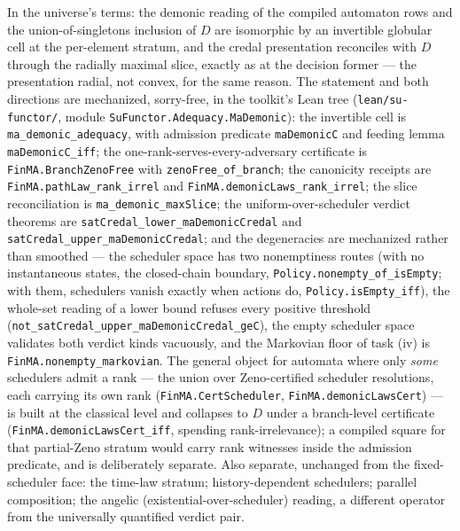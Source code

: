 In the universe's terms: the demonic reading of the compiled automaton
rows and the union-of-singletons inclusion of $D$ are isomorphic by an
invertible globular cell at the per-element stratum, and the credal
presentation reconciles with $D$ through the radially maximal slice,
exactly as at the decision former --- the presentation radial, not
convex, for the same reason.  The statement and both directions are
mechanized, sorry-free, in the toolkit's Lean tree
(\texttt{lean/su-functor/}, module
\texttt{SuFunctor.Adequacy.MaDemonic}): the invertible cell is
\texttt{ma\_demonic\_adequacy}, with admission predicate
\texttt{maDemonicC} and feeding lemma \texttt{maDemonicC\_iff}; the
one-rank-serves-every-adversary certificate is
\texttt{FinMA.BranchZenoFree} with \texttt{zenoFree\_of\_branch}; the
canonicity receipts are \texttt{FinMA.pathLaw\_rank\_irrel} and
\texttt{FinMA.demonicLaws\_rank\_irrel}; the slice reconciliation is
\texttt{ma\_demonic\_maxSlice}; the uniform-over-scheduler verdict
theorems are \texttt{satCredal\_lower\_maDemonicCredal} and
\texttt{satCredal\_upper\_maDemonicCredal}; and the degeneracies are
mechanized rather than smoothed --- the scheduler space has two
nonemptiness routes (with no instantaneous states, the closed-chain
boundary, \texttt{Policy.nonempty\_of\_isEmpty}; with them,
schedulers vanish exactly when actions do,
\texttt{Policy.isEmpty\_iff}), the whole-set reading of a lower bound
refuses every positive threshold
(\texttt{not\_satCredal\_upper\_maDemonicCredal\_geC}), the empty
scheduler space validates both verdict kinds vacuously, and the
Markovian floor of task (iv) is \texttt{FinMA.nonempty\_markovian}.
The general object for automata where only \emph{some} schedulers
admit a rank --- the union over Zeno-certified scheduler resolutions,
each carrying its own rank (\texttt{FinMA.CertScheduler},
\texttt{FinMA.demonicLawsCert}) --- is built at the classical level
and collapses to $D$ under a branch-level certificate
(\texttt{FinMA.demonicLawsCert\_iff}, spending rank-irrelevance); a
compiled square for that partial-Zeno stratum would carry rank
witnesses inside the admission predicate, and is deliberately
separate.  Also separate, unchanged from the fixed-scheduler face:
the time-law stratum; history-dependent schedulers; parallel
composition; the angelic (existential-over-scheduler) reading, a
different operator from the universally quantified verdict pair.

